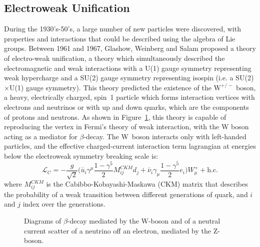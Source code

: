 \documentclass[/main.tex]{subfiles}
\begin{document}
\subsection{Electroweak Unification}
During the 1930's-50's, a large number of new particles were discovered, with properties and interactions that could be described using the algebra of Lie groups.
Between 1961 and 1967, Glashow, Weinberg and Salam proposed a theory of electro-weak unification, a theory which simultaneously described the electromagnetic and weak interactions with a U(1) gauge symmetry representing weak hypercharge and a SU(2) gauge symmetry representing isospin (i.e. a SU(2)$\times$U(1) gauge symmetry)\cite{Glashow1962, Weinberg1967, Salam1968}.
This theory predicted the existence of the $\mathrm{W}^{+/-}$ boson, a heavy, electrically charged, spin~1 particle which forms interaction vertices with electrons and neutrinos or with up and down quarks, which are the components of protons and neutrons.
As shown in Figure~\ref{fig:betadecayW}, this theory is capable of reproducing the vertex in Fermi's theory of weak interaction, with the W boson acting as a mediator for $\beta$-decay.
The W~boson interacts only with left-handed particles, and the effective charged-current interaction term lagrangian at energies below the electroweak symmetry breaking scale is:
\begin{equation}
  \mathcal{L}_C=-\frac{g}{\sqrt{2}}\big(\bar u_i \gamma^\mu \frac{1-\gamma^5}{2} M^{CKM}_{ij}d_j + \bar \nu_i \gamma_\mu \frac{1-\gamma^5}{2} e_i\big)W^+_\mu + \mathrm{h.c.}  
\end{equation}
where $M^{CKM}_{ij}$ is the Cabibbo-Kobayashi-Maskawa (CKM) matrix that describes the probability of a weak transition between different generations of quark, and $i$ and $j$ index over the generations.
\begin{figure}[t]
  \centering
  \caption[$\beta$-decay diagram with W]{\label{fig:betadecayW}
    Diagrams of $\beta$-decay mediated by the W-boson and of a neutral current scatter of a neutrino off an electron, mediated by the Z-boson.
  }
\end{figure}
\end{document}
